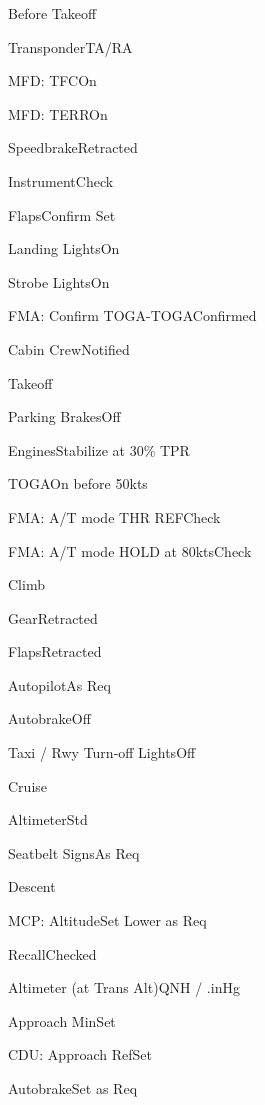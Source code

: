 \documentclass[sim-use, halfpage]{checklist}
\begin{document}
\begin{checklist}{Before Takeoff}
  \item{Transponder}{TA/RA}
  \item{MFD: TFC}{On}
  \item{MFD: TERR}{On}
  \item{Speedbrake}{Retracted}
  \item{Instrument}{Check}
  \item{Flaps}{Confirm Set}
  \item{Landing Lights}{On}
  \item{Strobe Lights}{On}
  \item{FMA: Confirm TOGA-TOGA}{Confirmed}
  \item{Cabin Crew}{Notified}
\end{checklist}

\begin{checklist}{Takeoff}
  \item{Parking Brakes}{Off}
  \item{Engines}{Stabilize at 30\% TPR}
  \item{TOGA}{On before 50kts}
  \item{FMA: A/T mode THR REF}{Check}
  \item{FMA: A/T mode HOLD at 80kts}{Check}
\end{checklist}

\begin{checklist}{Climb}
  \item{Gear}{Retracted}
  \item{Flaps}{Retracted}
  \item{Autopilot}{As Req}
  \item{Autobrake}{Off}
  \item{Taxi / Rwy Turn-off Lights}{Off}
\end{checklist}

\begin{checklist}{Cruise}
  \item{Altimeter}{Std}
  \item{Seatbelt Signs}{As Req}
\end{checklist}

\begin{checklist}{Descent}
  \item{MCP: Altitude}{Set Lower as Req}
  \item{Recall}{Checked}
  \item{Altimeter (at Trans Alt)}{\blank QNH / \blank.\blank inHg}
  \item{Approach Min}{Set}
  \item{CDU: Approach Ref}{Set}
  \item{Autobrake}{Set as Req}
\end{checklist}
\end{document}
